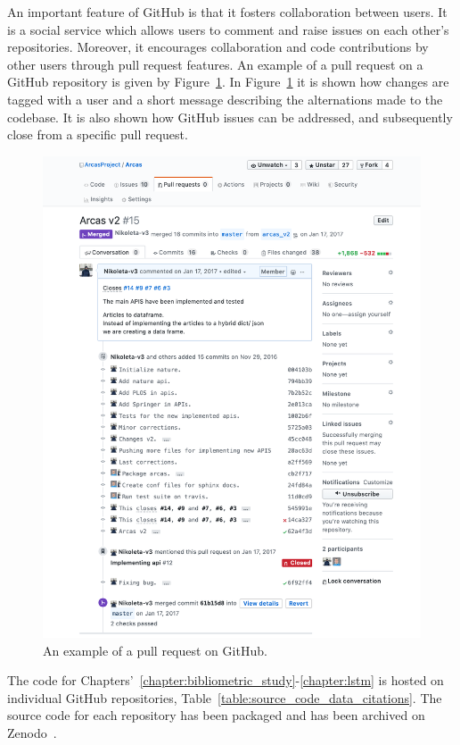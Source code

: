 An important feature of GitHub is that it fosters collaboration between users.
It is a social service which allows users to comment and raise issues on each
other's repositories. Moreover, it encourages collaboration and code contributions
by other users through pull request features. An example of a pull request on
a GitHub repository is given by Figure~\ref{fig:pull_request_github}. In Figure~\ref{fig:pull_request_github}
it is shown how changes are tagged with a user and a short message describing
the alternations made to the codebase. It is also shown how GitHub issues can be
addressed, and subsequently close from a specific pull request.

\begin{figure}[!hbtp]
    \centering
    \includegraphics[width=.8\textwidth]{src/chapters/01/img/GitHub_discussion}
    \caption{An example of a pull request on GitHub.}\label{fig:pull_request_github}
\end{figure}

The code for Chapters'~\ref{chapter:bibliometric_study}-\ref{chapter:lstm} is
hosted on individual GitHub repositories,
Table~\ref{table:source_code_data_citations}. The source code for each
repository has been packaged and has been archived on Zenodo~\cite{zenodo}.  %

